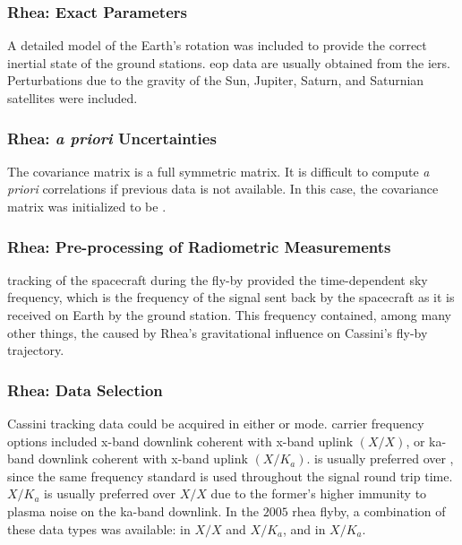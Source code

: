 \documentclass{article}
\begin{document}
            \subsubsection{\footnotesize Rhea: Exact Parameters}
                A detailed model of the Earth's rotation was included to
                provide the correct inertial state of the ground stations.
                \gls{eop} data are usually obtained from the \gls{iers}.
                Perturbations due to the gravity of the Sun, Jupiter,
                Saturn, and Saturnian satellites were included.
            \subsubsection{\footnotesize Rhea: \textit{a priori} Uncertainties} 
                The \gls{covariance matrix} is a full
                \gls{symmetric matrix}. It is difficult to compute
                \textit{a priori} correlations if previous data is not
                available. In this case, the covariance matrix was
                initialized to be .
            \subsubsection{\footnotesize Rhea: Pre-processing of Radiometric Measurements}
                 tracking of the
                spacecraft during the fly-by provided the time-dependent
                \gls{sky frequency}, which is the frequency of the signal
                sent back by the spacecraft as it is received on Earth by
                the ground station. This frequency contained, among many
                other things, the 
                caused by Rhea’s gravitational influence on Cassini’s
                fly-by trajectory.
            \subsubsection{\footnotesize Rhea: Data Selection}
                Cassini tracking data could be acquired in either
                 or
                 mode.
                \Gls{carrier} frequency options included \gls{x-band}
                \gls{downlink} \gls{coherent} with \gls{x-band}
                \gls{uplink} $(X/X)$, or \gls{ka-band} \gls{downlink}
                \gls{coherent} with \gls{x-band} uplink $(X/K_{a})$.
                 is usually preferred
                over , since the
                same \gls{frequency} standard is used throughout the signal
                round trip time. $X/K_{a}$ is usually preferred over $X/X$
                due to the former’s higher immunity to \gls{plasma} noise
                on the \gls{ka-band} \gls{downlink}. In the $2005$
                \gls{rhea} flyby, a combination of these data types was
                available:  in $X/X$
                and $X/K_{a}$, and  in $X/K_{a}$.
\end{document}
